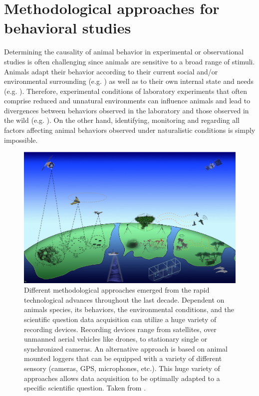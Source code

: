 \documentclass[11pt,pdftex]{article}
\begin{document}
\section{Methodological approaches for behavioral studies}

Determining the causality of animal behavior in experimental or observational studies is often challenging since animals are sensitive to a broad range of stimuli. Animals adapt their behavior according to their current social and/or environmental surrounding (e.g. \citealp{Chapman1995, Sapolsky2005, Markham2015}) as well as to their own internal state and needs (e.g. \citealp{Boon2007}). Therefore, experimental conditions of laboratory experiments that often comprise reduced and unnatural environments can influence animals and lead to divergences between behaviors observed in the laboratory and those observed in the wild (e.g. \citealp{Cheney1995, Rendall1999, Henninger2018}). On the other hand, identifying, monitoring and regarding all factors affecting animal behaviors observed under naturalistic conditions is simply impossible.

\begin{figure}[h!]
  \centerline{\includegraphics[width=.8\textwidth]{methods_behavioral_studies}}
  \caption{\label{methods_hebavioral_studies} Different methodological approaches emerged from the rapid technological advances throughout the last decade. Dependent on animals species, its behaviors, the environmental conditions, and the scientific question data acquisition can utilize a huge variety of recording devices. Recording devices range from satellites, over unmanned aerial vehicles like drones, to stationary single or synchronized cameras. An alternative approach is based on animal mounted loggers that can be equipped with a variety of different sensory (cameras, GPS, microphones, etc.). This huge variety of approaches allows data acquisition to be optimally adapted to a specific scientific question. Taken from \citet{Hughey2018}.}
\end{figure}
\end{document}
